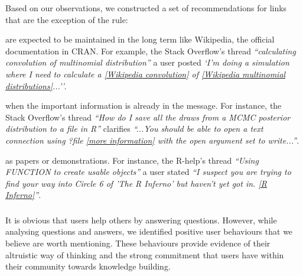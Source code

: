     Based on our observations, we constructed a set of recommendations for links that are the exception of the rule:

    \begin{description}[itemsep=3pt, topsep=2pt, leftmargin=1em, parsep=0pt]
        \item[Well known websites] are expected to be maintained in the long term like Wikipedia, the official documentation in CRAN.
        For example, the Stack Overflow's thread \textit{``calculating convolution of multinomial distribution''} a user posted \textit{`I'm doing a simulation where I need to calculate a \href{https://en.wikipedia.org/wiki/Convolution_of_probability_distributions}{[Wikipedia convolution]} of \href{https://en.wikipedia.org/wiki/Multinomial_distribution}{[Wikipedia multinomial distributions]}...''}.

        \item[Resources that support or expand the message] when the important information is already in the message.
        For instance, the Stack Overflow's thread \textit{``How do I save all the draws from a MCMC posterior distribution to a file in R''} clarifies \textit{``...You should be able to open a text connection using ?file \href{http://stat.ethz.ch/R-manual/R-devel/library/base/html/connections.html}{[more information]} with the open argument set to write...''}.

        \item[Material relevant to the message is too big] as papers or demonstrations.
        For instance, the R-help's thread \textit{``Using FUNCTION to create usable objects''} a user stated \textit{``I suspect you are trying to find your way into Circle 6 of 'The R Inferno' but haven't yet got in. \href{http://www.burns-stat.com/pages/Tutor/R\_inferno.pdf}{[R Inferno]}''}.
    \end{description}

\subsubsection{\rece}
\label{sec:userbeh}

It is obvious that users help others by answering questions. However, while analysing questions and answers, we identified positive user behaviours that
we believe are worth mentioning.  These behaviours provide evidence of their altruistic way of thinking and the strong commitment that users have within their
community towards knowledge building.

